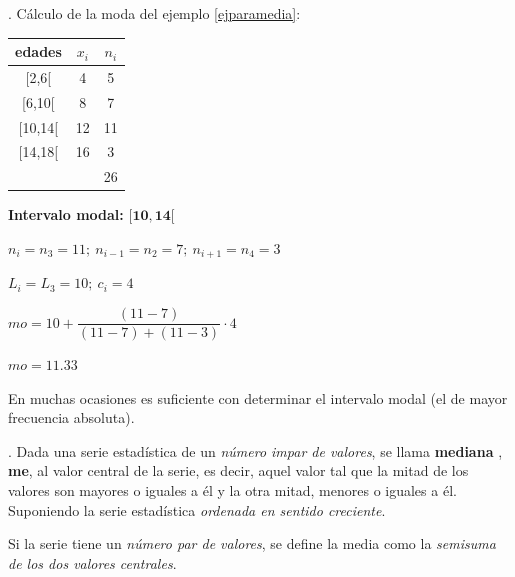 \vspace{5mm}%
\begin{example}
	. Cálculo de la moda del ejemplo \ref{ejparamedia}:	
	
\begin{multicols}{2}
\small
\begin{table}[H]
\centering
\begin{tabular}{cc|c|}
\hline
\multicolumn{1}{|c|}{\textbf{edades}} & \textbf{$x_i$} & \textbf{$n_i$} \\ \hline
\multicolumn{1}{c|}{[2,6[}            & 4              & 5              \\
\multicolumn{1}{c|}{[6,10[}           & 8              & 7              \\
\multicolumn{1}{c|}{[10,14[}          & 12             & 11             \\
\multicolumn{1}{c|}{[14,18[}          & 16             & 3             \\ \cline{3-3} 
                                      &                & 26             \\ \cline{3-3} 
\end{tabular}
\end{table}
\textbf{Intervalo modal:} $\boldsymbol{ [10,14[ }$

$n_i=n_3=11;\ n_{i-1}=n_2=7;\ n_{i+1}=n_4=3$

$L_i=L_3=10;\ c_i=4$

$mo=10+\dfrac{(11-7)}{(11-7)+(11-3)}\cdot 4$

$mo=11.33$

\end{multicols}
	
En muchas ocasiones es suficiente con determinar el intervalo modal (el de mayor frecuencia absoluta).
\end{example}

\vspace{5mm}%
\begin{definition}
	. Dada una serie estadística de un \emph{número impar de valores}, se llama \textbf{mediana} , \textbf{me}, al valor central de la serie, es decir, aquel valor tal que	 la mitad de los valores son mayores o iguales a él y la otra mitad, menores o iguales a él. Suponiendo la serie estadística \emph{ordenada en sentido creciente}.
	
	\vspace{2mm} Si la serie tiene un \emph{número par de valores}, se define la media como la \emph{semisuma de los dos valores centrales}.
\end{definition}

